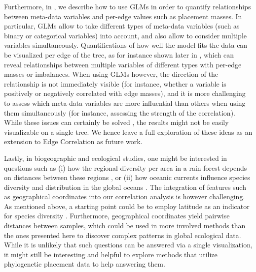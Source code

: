 Furthermore, in , we describe how to use \acfp{GLM}
in order to quantify relationships between meta-data variables and per-edge values such as placement masses.
In particular, \acp{GLM} allow to take different types of meta-data variables
(such as binary or categorical variables) into account, and also allow to consider multiple variables simultaneously.
Quantifications of how well the model fits the data can be visualized per edge of the tree,
as for instance shown later in ,
which can reveal relationships between multiple variables of different types with per-edge masses or imbalances.
When using \acp{GLM} however, the direction of the relationship is not immediately visible
(for instance, whether a variable is positively or negatively correlated with edge masses),
and it is more challenging to assess which meta-data variables are more influential than others
when using them simultaneously (for instance, assessing the strength of the correlation).
While these issues can certainly be solved \cite{Gevrey2003},
the results might not be easily visualizable on a single tree.
We hence leave a full exploration of these ideas as an extension to Edge Correlation as future work.

Lastly, in biogeographic and ecological studies, one might be interested in questions such as
(i) how the regional diversity per area in a rain forest depends on distances between these regions \cite{Lentendu2018},
or (ii) how oceanic currents influence species diversity and distribution in the global oceans \cite{Sunagawa2015}.
The integration of features such as geographical coordinates into our correlation analysis is however challenging.
As mentioned above, a starting point could be to employ latitude as an indicator for species diversity \cite{Sunagawa2015}.
Furthermore, geographical coordinates yield pairwise distances between samples,
which could be used in more involved methods than the ones presented here
to discover complex patterns in global ecological data.
While it is unlikely that such questions can be answered via a single visualization,
it might still be interesting and helpful to explore methods
that utilize phylogenetic placement data to help answering them.
